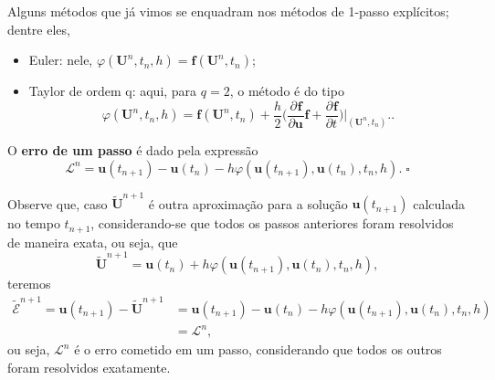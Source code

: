 \documentclass[../differential_methods.tex]{subfiles}
\begin{document}
\begin{example}
	Alguns métodos que já vimos se enquadram nos métodos de 1-passo explícitos; dentre eles,
	\begin{itemize}
		\item Euler: nele, \(\varphi (\mathbf{U}^{n}, t_{n}, h) = \mathbf{f}(\mathbf{U}^{n}, t_{n})\);
		\item Taylor de ordem q: aqui, para \(q=2\), o método é do tipo
		      \[
			      \varphi (\mathbf{U}^{n}, t_{n}, h) = \mathbf{f}(\mathbf{U}^{n}, t_{n}) + \frac{h}{2}\biggl(\frac{\partial^{}\mathbf{f}}{\partial \mathbf{u}^{}}\mathbf{f} + \frac{\partial^{}\mathbf{f}}{\partial t^{}}\biggr)\biggl|_{(\mathbf{U}^{n}, t_{n})}^{}\biggr..
		      \]
	\end{itemize}
\end{example}
\begin{def*}
	O \textbf{erro de um passo} é dado pela expressão
	\[
		\mathcal{L}^{n} = \mathbf{u}(t_{n+1})-\mathbf{u}(t_{n}) - h \varphi (\mathbf{u}(t_{n+1}), \mathbf{u}(t_{n}), t_{n}, h). \; \square
	\]
\end{def*}
Observe que, caso \(\tilde{\mathbf{U}}^{n+1}\) é outra aproximação para a solução \(\mathbf{u}(t_{n+1})\) calculada no tempo \(t_{n+1}\), considerando-se que todos os passos anteriores foram resolvidos de maneira exata, ou seja, que
\[
	\tilde{\mathbf{U}}^{n+1} = \mathbf{u}(t_{n}) + h \varphi (\mathbf{u}(t_{n+1}), \mathbf{u}(t_{n}), t_{n}, h),
\]
teremos
\begin{align*}
	\tilde{\mathcal{E}}^{n+1} = \mathbf{u}(t_{n+1}) - \tilde{\mathbf{U}}^{n+1} & =\mathbf{u}(t_{n+1})-\mathbf{u}(t_{n}) - h \varphi (\mathbf{u}(t_{n+1}), \mathbf{u}(t_{n}), t_{n}, h) \\
	                                                                           & = \mathcal{L}^{n},
\end{align*}
ou seja, \(\mathcal{L}^{n}\) é o erro cometido em um passo, considerando que todos os outros foram resolvidos exatamente.
\end{document}
